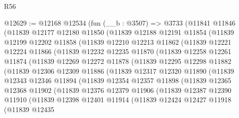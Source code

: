 \begin{lexlean}{R56}
\begin{coremodule}
@12629 := @12168
    @12534
    (fun (__b : @3507) =>
    @3733
      (@11841
        @11846
        (@11839
          @12177
          @12180
          @11850
          (@11839
            @12188
            @12191
            @11854
            (@11839
              @12199
              @12202
              @11858
              (@11839
                @12210
                @12213
                @11862
                (@11839
                  @12221
                  @12224
                  @11866
                  (@11839
                    @12232
                    @12235
                    @11870
                    (@11839
                      @12258
                      @12261
                      @11874
                      (@11839
                        @12269
                        @12272
                        @11878
                        (@11839
                          @12295
                          @12298
                          @11882
                          (@11839
                            @12306
                            @12309
                            @11886
                            (@11839
                              @12317
                              @12320
                              @11890
                              (@11839
                                @12343
                                @12346
                                @11894
                                (@11839
                                  @12354
                                  @12357
                                  @11898
                                  (@11839
                                    @12365
                                    @12368
                                    @11902
                                    (@11839
                                      @12376
                                      @12379
                                      @11906
                                      (@11839
                                        @12387
                                        @12390
                                        @11910
                                        (@11839
                                          @12398
                                          @12401
                                          @11914
                                          (@11839
                                            @12424
                                            @12427
                                            @11918
                                            (@11839
                                              @12435

\end{coremodule}
\end{lexlean}
